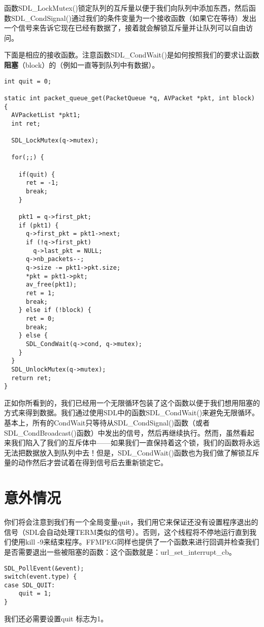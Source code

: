 函数SDL_LockMutex()锁定队列的互斥量以便于我们向队列中添加东西，然后函数SDL_CondSignal()通过我们的条件变量为一个接收函数（如果它在等待）发出一个信号来告诉它现在已经有数据了，接着就会解锁互斥量并让队列可以自由访问。

下面是相应的接收函数。注意函数SDL_CondWait()是如何按照我们的要求让函数\textbf{阻塞}（block）的（例如一直等到队列中有数据）。
\begin{lstlisting}
int quit = 0;

static int packet_queue_get(PacketQueue *q, AVPacket *pkt, int block) {
  AVPacketList *pkt1;
  int ret;

  SDL_LockMutex(q->mutex);

  for(;;) {

    if(quit) {
      ret = -1;
      break;
    }

    pkt1 = q->first_pkt;
    if (pkt1) {
      q->first_pkt = pkt1->next;
      if (!q->first_pkt)
        q->last_pkt = NULL;
      q->nb_packets--;
      q->size -= pkt1->pkt.size;
      *pkt = pkt1->pkt;
      av_free(pkt1);
      ret = 1;
      break;
    } else if (!block) {
      ret = 0;
      break;
    } else {
      SDL_CondWait(q->cond, q->mutex);
    }
  }
  SDL_UnlockMutex(q->mutex);
  return ret;
}
\end{lstlisting}

正如你所看到的，我们已经用一个无限循环包装了这个函数以便于我们想用阻塞的方式来得到数据。我们通过使用SDL中的函数SDL_CondWait()来避免无限循环。基本上，所有的CondWait只等待从SDL_CondSignal()函数（或者SDL_CondBroadcast()函数）中发出的信号，然后再继续执行。然而，虽然看起来我们陷入了我们的互斥体中——如果我们一直保持着这个锁，我们的函数将永远无法把数据放入到队列中去！但是，SDL_CondWait()函数也为我们做了解锁互斥量的动作然后才尝试着在得到信号后去重新锁定它。

\section{意外情况}

你们将会注意到我们有一个全局变量quit，我们用它来保证还没有设置程序退出的信号（SDL会自动处理TERM类似的信号）。否则，这个线程将不停地运行直到我们使用kill -9来结束程序。FFMPEG同样也提供了一个函数来进行回调并检查我们是否需要退出一些被阻塞的函数：这个函数就是：url_set_interrupt_cb。

\begin{lstlisting}
SDL_PollEvent(&event);
switch(event.type) {
case SDL_QUIT:
	quit = 1;
}
\end{lstlisting}
我们还必需要设置quit 标志为1。

